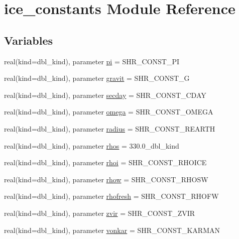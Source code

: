 \hypertarget{namespaceice__constants}{
\section{ice\_\-constants Module Reference}
\label{namespaceice__constants}
}
\subsection*{Variables}
\begin{DoxyCompactItemize}
\item 
real(kind=dbl\_\-kind), parameter \hyperlink{namespaceice__constants_ab88fe0d16ebc9529ef11d6fe4343c387}{pi} = SHR\_\-CONST\_\-PI
\item 
real(kind=dbl\_\-kind), parameter \hyperlink{namespaceice__constants_ab875779750d9ad8407a02a9ec6bd8bda}{gravit} = SHR\_\-CONST\_\-G
\item 
real(kind=dbl\_\-kind), parameter \hyperlink{namespaceice__constants_a4834c667201b1d05b8a0a0cf79b10742}{secday} = SHR\_\-CONST\_\-CDAY
\item 
real(kind=dbl\_\-kind), parameter \hyperlink{namespaceice__constants_ab975492734f7183079c68d7b88d27146}{omega} = SHR\_\-CONST\_\-OMEGA
\item 
real(kind=dbl\_\-kind), parameter \hyperlink{namespaceice__constants_a7ec9d7c0e7bcd12bc711119922edce91}{radius} = SHR\_\-CONST\_\-REARTH
\item 
real(kind=dbl\_\-kind), parameter \hyperlink{namespaceice__constants_ae2404a45dc46ecdb371055dd52dcfe1f}{rhos} = 330.0\_\-dbl\_\-kind
\item 
real(kind=dbl\_\-kind), parameter \hyperlink{namespaceice__constants_ab8aa44724cb8c314b55a09244600f68d}{rhoi} = SHR\_\-CONST\_\-RHOICE
\item 
real(kind=dbl\_\-kind), parameter \hyperlink{namespaceice__constants_a64fecf2ffd940ef72dbaa94c096930de}{rhow} = SHR\_\-CONST\_\-RHOSW
\item 
real(kind=dbl\_\-kind), parameter \hyperlink{namespaceice__constants_a6aa217bd72fe4e73265e915de96c3665}{rhofresh} = SHR\_\-CONST\_\-RHOFW
\item 
real(kind=dbl\_\-kind), parameter \hyperlink{namespaceice__constants_a87b8d7a8a072b85b26c14b96e443879e}{zvir} = SHR\_\-CONST\_\-ZVIR
\item 
real(kind=dbl\_\-kind), parameter \hyperlink{namespaceice__constants_a16411cd5c8476ea99195954dd945cc44}{vonkar} = SHR\_\-CONST\_\-KARMAN
\item 

\end{DoxyCompactItemize}
